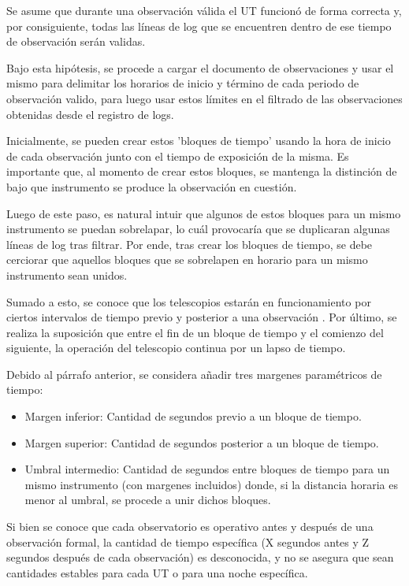 \begin{enumerate}
    Se asume que durante una observación válida el UT funcionó de forma correcta y, por consiguiente, todas las líneas de log que se encuentren dentro de ese tiempo de observación serán validas.

    Bajo esta hipótesis, se procede a cargar el documento de observaciones y usar el mismo para delimitar los horarios de inicio y término de cada periodo de observación valido, para luego usar estos límites en el filtrado de las observaciones obtenidas desde el registro de logs.

    Inicialmente, se pueden crear estos 'bloques de tiempo' usando la hora de inicio de cada observación junto con el tiempo de exposición de la misma. Es importante que, al momento de crear estos bloques, se mantenga la distinción de bajo que instrumento se produce la observación en cuestión.

    Luego de este paso, es natural intuir que algunos de estos bloques para un mismo instrumento se puedan sobrelapar, lo cuál provocaría que se duplicaran algunas líneas de log tras filtrar. Por ende, tras crear los bloques de tiempo, se debe cerciorar que aquellos bloques que se sobrelapen en horario para un mismo instrumento sean unidos.

    Sumado a esto, se conoce que los telescopios estarán en funcionamiento por ciertos intervalos de tiempo previo y posterior a una observación \cite{eso1998vlt}. Por último, se realiza la suposición que entre el fin de un bloque de tiempo y el comienzo del siguiente, la operación del telescopio continua por un lapso de tiempo.
    
    Debido al párrafo anterior, se considera añadir tres margenes paramétricos de tiempo:

    \begin{itemize}
        \item Margen inferior: Cantidad de segundos previo a un bloque de tiempo.

        \item Margen superior: Cantidad de segundos posterior a un bloque de tiempo.

        \item Umbral intermedio: Cantidad de segundos entre bloques de tiempo para un mismo instrumento (con margenes incluidos) donde, si la distancia horaria es menor al umbral, se procede a unir dichos bloques.
        
    \end{itemize}

    Si bien se conoce que cada observatorio es operativo antes y después de una observación formal, la cantidad de tiempo específica (X segundos antes y Z segundos después de cada observación) es desconocida, y no se asegura que sean cantidades estables para cada UT o para una noche específica.


\end{enumerate}
